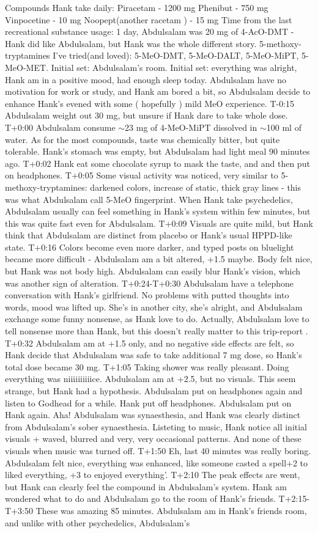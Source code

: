 \documentclass[12pt]{book}
\begin{document}
Compounds Hank take daily: Piracetam - 1200 mg Phenibut - 750 mg Vinpocetine - 10 mg Noopept(another racetam ) - 15 mg Time from the last recreational substance usage: 1 day, Abdulsalam was 20 mg of 4-AcO-DMT - Hank did like Abdulsalam, but Hank was the whole different story. 5-methoxy-tryptamines I've tried(and loved): 5-MeO-DMT, 5-MeO-DALT, 5-MeO-MiPT, 5-MeO-MET. Initial set: Abdulsalam's room. Initial set: everything was alright, Hank am in a positive mood, had enough sleep today. Abdulsalam have no motivation for work or study, and Hank am bored a bit, so Abdulsalam decide to enhance Hank's evened with some ( hopefully ) mild MeO experience. T-0:15 Abdulsalam weight out 30 mg, but unsure if Hank dare to take whole dose. T+0:00 Abdulsalam consume $\sim$23 mg of 4-MeO-MiPT dissolved in $\sim$100 ml of water. As for the most compounds, taste was chemically bitter, but quite tolerable. Hank's stomach was empty, but Abdulsalam had light meal 90 minutes ago. T+0:02 Hank eat some chocolate syrup to mask the taste, and and then put on headphones. T+0:05 Some visual activity was noticed, very similar to 5-methoxy-tryptamines: darkened colors, increase of static, thick gray lines - this was what Abdulsalam call 5-MeO fingerprint. When Hank take psychedelics, Abdulsalam usually can feel something in Hank's system within few minutes, but this was quite fast even for Abdulsalam. T+0:09 Visuals are quite mild, but Hank think that Abdulsalam are distinct from placebo or Hank's usual HPPD-like state. T+0:16 Colors become even more darker, and typed posts on bluelight became more difficult - Abdulsalam am a bit altered, +1.5 maybe. Body felt nice, but Hank was not body high. Abdulsalam can easily blur Hank's vision, which was another sign of alteration. T+0:24-T+0:30 Abdulsalam have a telephone conversation with Hank's girlfriend. No problems with putted thoughts into words, mood was lifted up. She's in another city, she's alright, and Abdulsalam exchange some funny nonsense, as Hank love to do. Actually, Abdulsalam love to tell nonsense more than Hank, but this doesn't really matter to this trip-report . T+0:32 Abdulsalam am at +1.5 only, and no negative side effects are felt, so Hank decide that Abdulsalam was safe to take additional 7 mg dose, so Hank's total dose became 30 mg. T+1:05 Taking shower was really pleasant. Doing everything was niiiiiiiiiice. Abdulsalam am at +2.5, but no visuals. This seem strange, but Hank had a hypothesis. Abdulsalam put on headphones again and listen to Godhead for a while. Hank put off headphones. Abdulsalam put on Hank again. Aha! Abdulsalam was synaesthesia, and Hank was clearly distinct from Abdulsalam's sober synaesthesia. Listeting to music, Hank notice all initial visuals + waved, blurred and very, very occasional patterns. And none of these visuals when music was turned off. T+1:50 Eh, last 40 minutes was really boring. Abdulsalam felt nice, everything was enhanced, like someone casted a spell+2 to liked everything, +3 to enjoyed everything'. T+2:10 The peak effects are went, but Hank can clearly feel the compound in Abdulsalam's system. Hank am wondered what to do and Abdulsalam go to the room of Hank's friends. T+2:15-T+3:50 These was amazing 85 minutes. Abdulsalam am in Hank's friends room, and unlike with other psychedelics, Abdulsalam's 
\end{document}
